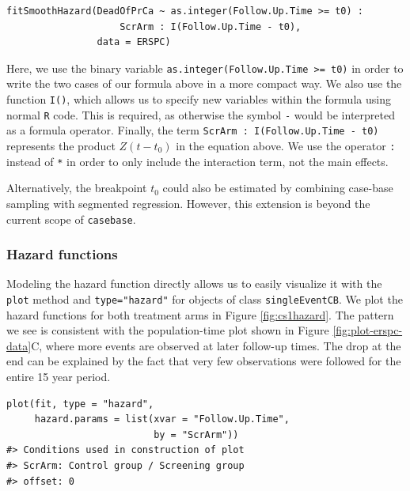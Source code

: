 \begin{verbatim}
fitSmoothHazard(DeadOfPrCa ~ as.integer(Follow.Up.Time >= t0) :
                    ScrArm : I(Follow.Up.Time - t0),
                data = ERSPC)
\end{verbatim}

Here, we use the binary variable \texttt{as.integer(Follow.Up.Time\ \textgreater{}=\ t0)} in order to write the two cases of our formula above in a more compact way. We also use the function \texttt{I()}, which allows us to specify new variables within the formula using normal \texttt{R} code. This is required, as otherwise the symbol \texttt{-} would be interpreted as a formula operator. Finally, the term \texttt{ScrArm\ :\ I(Follow.Up.Time\ -\ t0)} represents the product \(Z (t - t_0)\) in the equation above. We use the operator \texttt{:} instead of \texttt{*} in order to only include the interaction term, not the main effects.

Alternatively, the breakpoint \(t_0\) could also be estimated by combining case-base sampling with segmented regression. However, this extension is beyond the current scope of \texttt{casebase}.

\hypertarget{hazard-functions}{%
\subsubsection{Hazard functions}\label{hazard-functions}}

Modeling the hazard function directly allows us to easily visualize it with
the \texttt{plot} method and \texttt{type="hazard"} for objects of class \texttt{singleEventCB}.
We plot the hazard functions for both treatment arms in Figure \ref{fig:cs1hazard}.
The pattern we see is consistent with the population-time plot shown in Figure \ref{fig:plot-erspc-data}C, where more events are observed at later follow-up times.
The drop at the end can be explained by the fact that very few observations were followed for the entire 15 year period.

\begin{verbatim}
plot(fit, type = "hazard",
     hazard.params = list(xvar = "Follow.Up.Time",
                          by = "ScrArm"))
#> Conditions used in construction of plot
#> ScrArm: Control group / Screening group
#> offset: 0
\end{verbatim}

